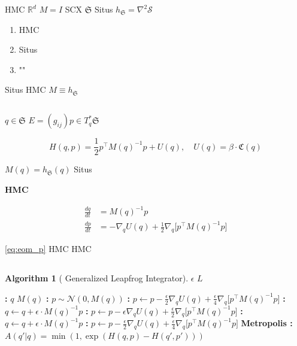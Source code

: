 \documentclass[12pt,a4paper]{article}
\theoremstyle{plain}
\theoremstyle{definition}
\newtheorem{algorithm-env}[theorem]{ Algorithm}
\newcommand{\R}{\mathbb{R}}
\newcommand{\Ncal}{\mathcal{N}}
\newcommand{\Situs}{\mathfrak{S}}
\newcommand{\Cercis}{\mathfrak{C}}
\begin{document}
 HMC  $\R^d$  $M = I$ SCX 
 $\Situs$ Situs  $h_{\Situs} = \nabla^2 \mathcal{S}$


\begin{enumerate}[label=(\arabic*)]
    \item \textbf{}  HMC 
    \item \textbf{}  Situs 
    \item \textbf{} ""
\end{enumerate}

\textbf{}  Situs  HMC  $M \equiv h_{\Situs}$

\subsection{}

 $q \in \Situs$  $E = (g_{ij})$$p \in T_q^*\Situs$ 


\begin{equation}\label{eq:hamiltonian}
    H(q, p) = \frac{1}{2} p^\top M(q)^{-1} p + U(q),\quad
    U(q) = \beta \cdot \Cercis(q)
\end{equation}

 $M(q) = h_{\Situs}(q)$  Situs 

\begin{keyeq}
\textbf{ HMC }

\begin{align}
    \frac{dq}{dt} &= M(q)^{-1} p \label{eq:eom_q} \\
    \frac{dp}{dt} &= -\nabla_q U(q) + \frac{1}{2} \nabla_q \big[ p^\top M(q)^{-1} p \big] \label{eq:eom_p}
\end{align}

 \eqref{eq:eom_p} \textbf{}
 HMC  HMC 
\end{keyeq}

\subsection{}

\begin{algorithm-env}[ Generalized Leapfrog Integrator]
 $\epsilon$  $L$

\begin{algorithmic}[1]
\State \textbf{:}  $q$ $M(q)$
\State \textbf{:} $p \sim \Ncal(0, M(q))$
\State \textbf{:}
    $p \leftarrow p - \frac{\epsilon}{2} \nabla_q U(q)
        + \frac{\epsilon}{4} \nabla_q \big[ p^\top M(q)^{-1} p \big]$
    \State \textbf{:}
        $q \leftarrow q + \epsilon \cdot M(q)^{-1} p$
    \State \textbf{:}
        $p \leftarrow p - \epsilon \nabla_q U(q)
            + \frac{\epsilon}{2} \nabla_q \big[ p^\top M(q)^{-1} p \big]$
\EndFor
\State \textbf{:}
    $q \leftarrow q + \epsilon \cdot M(q)^{-1} p$
\State \textbf{:}
    $p \leftarrow p - \frac{\epsilon}{2} \nabla_q U(q)
        + \frac{\epsilon}{4} \nabla_q \big[ p^\top M(q)^{-1} p \big]$
\State \textbf{Metropolis :}
    $A(q'|q) = \min(1, \exp(H(q,p) - H(q',p')))$
\end{algorithmic}
\end{algorithm-env}
\end{document}
